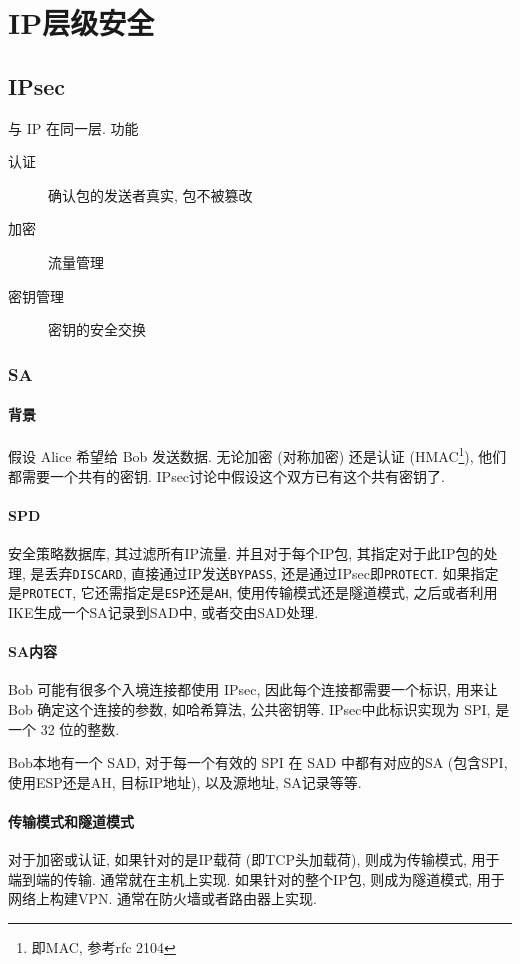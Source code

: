 \documentclass{ctexart}
\begin{document}
\section{IP层级安全}
\subsection{IPsec}
    与 IP 在同一层. 功能 \begin{description}
        \item[认证] 确认包的发送者真实, 包不被篡改
        \item[加密] 流量管理
        \item[密钥管理] 密钥的安全交换
    \end{description}
\subsubsection{SA}
\paragraph{背景} 假设 Alice 希望给 Bob 发送数据.
    无论加密 (对称加密) 还是认证 (HMAC\footnote{即MAC, 参考rfc 2104}), 他们都需要一个共有的密钥.
    IPsec讨论中假设这个双方已有这个共有密钥了.
\paragraph{SPD} 安全策略数据库, 其过滤所有IP流量.
    并且对于每个IP包, 其指定对于此IP包的处理,
    是丢弃\verb/DISCARD/, 直接通过IP发送\verb/BYPASS/,
    还是通过IPsec即\verb/PROTECT/.
    如果指定是\verb/PROTECT/, 它还需指定是\verb/ESP/还是\verb/AH/,
    使用传输模式还是隧道模式,
    之后或者利用IKE生成一个SA记录到SAD中, 或者交由SAD处理.
\paragraph{SA内容} Bob 可能有很多个入境连接都使用 IPsec,
    因此每个连接都需要一个标识, 用来让 Bob 确定这个连接的参数,
    如哈希算法, 公共密钥等. IPsec中此标识实现为 SPI, 是一个 32 位的整数.\par
    Bob本地有一个 SAD, 对于每一个有效的 SPI 在 SAD 中都有对应的SA (包含SPI, 使用ESP还是AH, 目标IP地址),
    以及源地址, SA记录等等.
\paragraph{传输模式和隧道模式}
    对于加密或认证, 如果针对的是IP载荷 (即TCP头加载荷), 则成为传输模式, 用于端到端的传输. 通常就在主机上实现.
    如果针对的整个IP包, 则成为隧道模式, 用于网络上构建VPN. 通常在防火墙或者路由器上实现.
\end{document}
